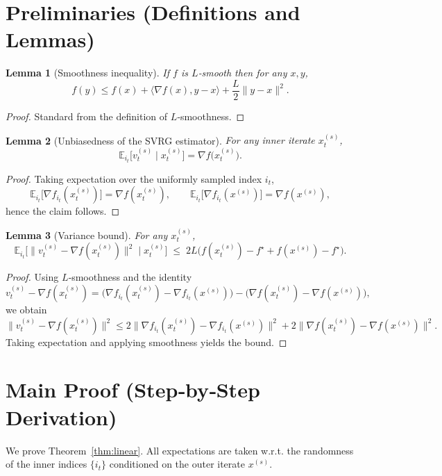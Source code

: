 \documentclass{article}
\newtheorem{lemma}{Lemma}
\newcommand{\E}{\mathbb{E}}
\begin{document}
\newpage
\section*{Preliminaries (Definitions and Lemmas)}
\begin{lemma}[Smoothness inequality]\label{lem:smooth}
If $f$ is $L$‑smooth then for any $x,y$,
\[
f(y)\le f(x)+\langle\nabla f(x),y-x\rangle+\frac{L}{2}\|y-x\|^2 .
\]
\end{lemma}
\begin{proof}
Standard from the definition of $L$‑smoothness. \qedhere
\end{proof}

\begin{lemma}[Unbiasedness of the SVRG estimator]\label{lem:unbiased}
For any inner iterate $x_t^{(s)}$,
\[
\E_{i_t}\bigl[v_t^{(s)}\mid x_t^{(s)}\bigr]=\nabla f\!\bigl(x_t^{(s)}\bigr).
\]
\end{lemma}
\begin{proof}
Taking expectation over the uniformly sampled index $i_t$,
\[
\E_{i_t}\!\bigl[\nabla f_{i_t}(x_t^{(s)})\bigr]=\nabla f(x_t^{(s)}),\qquad
\E_{i_t}\!\bigl[\nabla f_{i_t}(x^{(s)})\bigr]=\nabla f(x^{(s)}),
\]
hence the claim follows. \qedhere
\end{proof}

\begin{lemma}[Variance bound]\label{lem:variance}
For any $x_t^{(s)}$,
\[
\E_{i_t}\!\bigl[\|v_t^{(s)}-\nabla f(x_t^{(s)})\|^2\mid x_t^{(s)}\bigr]
\;\le\; 2L\bigl(f(x_t^{(s)})-f^\star+f(x^{(s)})-f^\star\bigr).
\]
\end{lemma}
\begin{proof}
Using $L$‑smoothness and the identity
\[
v_t^{(s)}-\nabla f(x_t^{(s)})=
\bigl(\nabla f_{i_t}(x_t^{(s)})-\nabla f_{i_t}(x^{(s)})\bigr)
-\bigl(\nabla f(x_t^{(s)})-\nabla f(x^{(s)})\bigr),
\]
we obtain
\[
\|v_t^{(s)}-\nabla f(x_t^{(s)})\|^2
\le 2\|\nabla f_{i_t}(x_t^{(s)})-\nabla f_{i_t}(x^{(s)})\|^2
   +2\|\nabla f(x_t^{(s)})-\nabla f(x^{(s)})\|^2 .
\]
Taking expectation and applying smoothness yields the bound. \qedhere
\end{proof}

\section*{Main Proof (Step‑by‑Step Derivation)}
We prove Theorem~\ref{thm:linear}.  
All expectations are taken w.r.t. the randomness of the inner indices $\{i_t\}$ conditioned on the outer iterate $x^{(s)}$.
\end{document}
